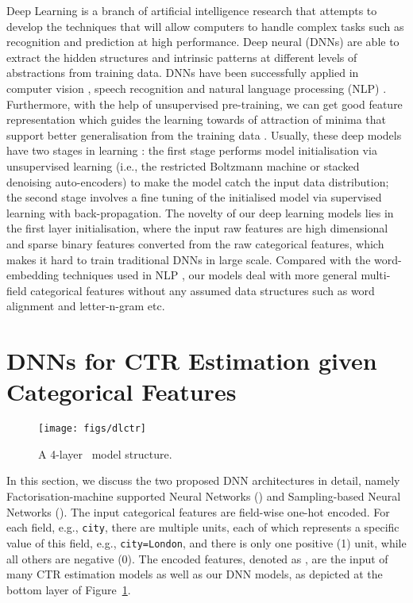 \documentclass{llncs}
\newcommand{\ft}{\texttt}
\newcommand{\fmnn}{\text{FNN}}
\newcommand{\snn}{\text{SNN}}
\begin{document}
Deep Learning \cite{bengio2009learning} is a branch of artificial intelligence research that attempts to develop the techniques that will allow computers to handle complex tasks such as recognition and prediction at high performance. Deep neural  (DNNs) are able to extract the hidden structures and intrinsic patterns at different levels of abstractions from training data. DNNs have been successfully applied in computer vision \cite{zeiler2011adaptive}, speech recognition \cite{deng2013deep} and natural language processing (NLP) \cite{collobert2011natural,huang2013learning,shen2014latent}. Furthermore, with the help of unsupervised pre-training, we can get good feature representation which guides the learning towards  of attraction of minima that support better generalisation from the training data \cite{erhan2010does}. Usually, these deep models have two stages in learning \cite{hinton2006reducing}: the first stage performs model initialisation via unsupervised learning (i.e., the restricted Boltzmann machine or stacked denoising auto-encoders) to make the model catch the input data distribution; the second stage involves a fine tuning of the initialised model via supervised learning with back-propagation. The novelty of our deep learning models lies in the first layer initialisation, where the input raw features are high dimensional and sparse binary features converted from the raw categorical features, which makes it hard to train traditional DNNs in large scale. Compared with the word-embedding techniques used in NLP \cite{huang2013learning,shen2014latent}, our models deal with more general multi-field categorical features without any assumed data structures such as word alignment and letter-n-gram etc.

\section{DNNs for CTR Estimation given Categorical Features}

\begin{figure}[t]
  \centering
  \vspace{-30pt}
  \texttt{[image: figs/dlctr]}\\
  \caption{A 4-layer \fmnn~model structure.}\label{fig:modelone}
\end{figure}

In this section, we discuss the two proposed DNN architectures in detail, namely Factorisation-machine supported Neural Networks (\fmnn) and Sampling-based Neural Networks (\snn).
The input categorical features are field-wise one-hot encoded. For each field, e.g., \ft{city}, there are multiple units, each of which represents a specific value of this field, e.g., \ft{city=London}, and there is only one positive (1) unit, while all others are negative (0). The encoded features, denoted as , are the input of many CTR estimation models \cite{richardson2007predicting,lee2012estimating} as well as our DNN models, as depicted at the bottom layer of Figure~\ref{fig:modelone}.
\end{document}
